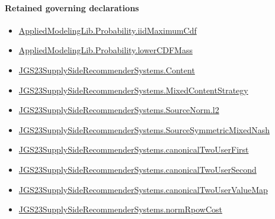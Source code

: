 \documentclass[10pt]{article}
\begin{document}
\paragraph{Retained governing declarations}
\begin{itemize}\raggedright
\item \hyperlink{governing-declaration-bd46383e262e9ee8}{Applied\allowbreak{}Modeling\allowbreak{}Lib.\allowbreak{}Probability.\allowbreak{}iid\allowbreak{}Maximum\allowbreak{}Cdf}
\item \hyperlink{governing-declaration-5dfc240c860659bf}{Applied\allowbreak{}Modeling\allowbreak{}Lib.\allowbreak{}Probability.\allowbreak{}lower\allowbreak{}CDF\allowbreak{}Mass}
\item \hyperlink{governing-declaration-367305fda50f0ada}{JGS23\allowbreak{}Supply\allowbreak{}Side\allowbreak{}Recommender\allowbreak{}Systems.\allowbreak{}Content}
\item \hyperlink{governing-declaration-2089965d06cf0282}{JGS23\allowbreak{}Supply\allowbreak{}Side\allowbreak{}Recommender\allowbreak{}Systems.\allowbreak{}Mixed\allowbreak{}Content\allowbreak{}Strategy}
\item \hyperlink{governing-declaration-9299663ffe3ecb38}{JGS23\allowbreak{}Supply\allowbreak{}Side\allowbreak{}Recommender\allowbreak{}Systems.\allowbreak{}Source\allowbreak{}Norm.\allowbreak{}l2}
\item \hyperlink{governing-declaration-8919e7334fa5ab60}{JGS23\allowbreak{}Supply\allowbreak{}Side\allowbreak{}Recommender\allowbreak{}Systems.\allowbreak{}Source\allowbreak{}Symmetric\allowbreak{}Mixed\allowbreak{}Nash}
\item \hyperlink{governing-declaration-abb7b5a1ce6f14ba}{JGS23\allowbreak{}Supply\allowbreak{}Side\allowbreak{}Recommender\allowbreak{}Systems.\allowbreak{}canonical\allowbreak{}Two\allowbreak{}User\allowbreak{}First}
\item \hyperlink{governing-declaration-fb292a037babdd07}{JGS23\allowbreak{}Supply\allowbreak{}Side\allowbreak{}Recommender\allowbreak{}Systems.\allowbreak{}canonical\allowbreak{}Two\allowbreak{}User\allowbreak{}Second}
\item \hyperlink{governing-declaration-972ab8301f65eaeb}{JGS23\allowbreak{}Supply\allowbreak{}Side\allowbreak{}Recommender\allowbreak{}Systems.\allowbreak{}canonical\allowbreak{}Two\allowbreak{}User\allowbreak{}Value\allowbreak{}Map}
\item \hyperlink{governing-declaration-54533813c77cea72}{JGS23\allowbreak{}Supply\allowbreak{}Side\allowbreak{}Recommender\allowbreak{}Systems.\allowbreak{}norm\allowbreak{}Rpow\allowbreak{}Cost}

\end{itemize}
\end{document}
